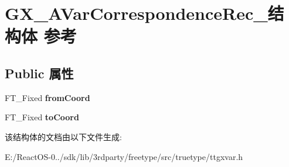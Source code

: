 \hypertarget{struct_g_x___a_var_correspondence_rec__}{}\section{G\+X\+\_\+\+A\+Var\+Correspondence\+Rec\+\_\+结构体 参考}
\label{struct_g_x___a_var_correspondence_rec__}
\subsection*{Public 属性}
\begin{DoxyCompactItemize}
\item 
\mbox{\label{struct_g_x___a_var_correspondence_rec___a57c4ff645e02d48ff2035cbdd5ddf170}} 
F\+T\+\_\+\+Fixed {\bfseries from\+Coord}
\item 
\mbox{\label{struct_g_x___a_var_correspondence_rec___a8850378f736f342d1b649fecf956ea8a}} 
F\+T\+\_\+\+Fixed {\bfseries to\+Coord}
\end{DoxyCompactItemize}


该结构体的文档由以下文件生成\+:\begin{DoxyCompactItemize}
\item 
E\+:/\+React\+O\+S-\/0../sdk/lib/3rdparty/freetype/src/truetype/ttgxvar.\+h\end{DoxyCompactItemize}
